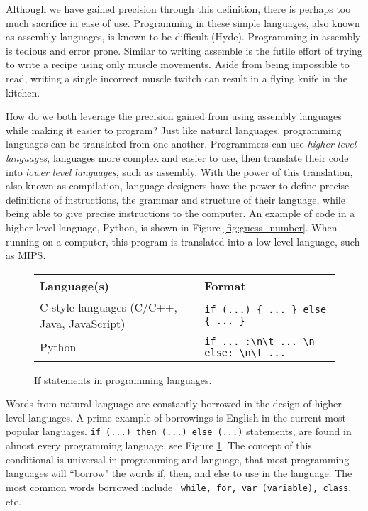 \documentclass[12pt]{article}
\begin{document}
\begin{flushleft}
Although we have gained precision through this definition, there is
perhaps too much sacrifice in ease of use. Programming in these simple
languages, also known as assembly languages, is known to be difficult (Hyde).
Programming in assembly is tedious and error prone. Similar to writing
assemble is the futile
effort of trying to write a recipe using only muscle movements. Aside from
being impossible to read, writing a single incorrect muscle twitch can
result in a flying knife in the kitchen. \footnotemark

How do we both leverage the precision gained from using assembly
languages while making it easier to program? Just like natural languages,
programming languages can be translated from one another. Programmers
can use \textit{higher level languages}, languages more complex and 
easier to use, then translate their code into \textit{lower level languages},
such as assembly. With the power of this translation,
also known as compilation, language designers
have the power to define precise definitions of instructions, the
grammar and structure of their language, while being able to give
precise instructions to the computer. An example of code in a higher level
language, Python, is shown in Figure \ref{fig:guess_number}. When running
on a computer, this program is translated into a low level language, such
as MIPS.

\begin{figure}[h]
\centering
\caption[Caption for LOF]{If statements in programming languages.}
\begin{tabular}{l l}
    Language(s) & Format \\
\hline
    C-style languages (C/C++, Java, JavaScript) &
    \verb|if (...) { ... } else { ... }| \\
    Python & \verb|if ... :\n\t ... \n else: \n\t ...|
\end{tabular}

\label{fig:if_then}
\end{figure}

Words from natural language are constantly borrowed in the design of higher
level languages. A prime example of borrowings is English in the current
most popular languages. \verb|if (...) then (...) else (...)| statements,
are found in almost every programming language, see Figure \ref{fig:if_then}.
The concept of this conditional is universal in programming and language, that
most programming languages will ``borrow" the words if, then, and else to use
in the language. The most common words borrowed include
\verb| while, for, var (variable), class|, etc. \footnotemark


\end{flushleft}
\end{document}
